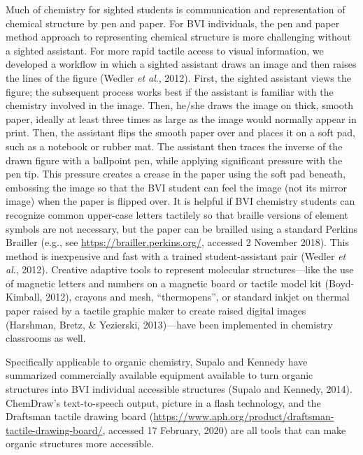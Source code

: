 \documentclass[11.5pt]{sig-alternate} %
\begin{document}
\begin{large}
Much of chemistry for sighted students is communication and representation of chemical structure by pen and paper. For BVI individuals, the pen and paper method approach to representing chemical structure is more challenging without a sighted assistant. For more rapid tactile access to visual information, we developed a workflow in which a sighted assistant draws an image and then raises the lines of the figure (Wedler \textit{et al}., 2012). First, the sighted assistant views the figure; the subsequent process works best if the assistant is familiar with the chemistry involved in the image. Then, he/she draws the image on thick, smooth paper, ideally at least three times as large as the image would normally appear in print. Then, the assistant flips the smooth paper over and places it on a soft pad, such as a notebook or rubber mat. The assistant then traces the inverse of the drawn figure with a ballpoint pen, while applying significant pressure with the pen tip. This pressure creates a crease in the paper using the soft pad beneath, embossing the image so that the BVI student can feel the image (not its mirror image) when the paper is flipped over. It is helpful if BVI chemistry students can recognize common upper-case letters tactilely so that braille versions of element symbols are not necessary, but the paper can be brailled using a standard Perkins Brailler (e.g., see \url{https://brailler.perkins.org/}, accessed 2 November 2018). This method is inexpensive and fast with a trained student-assistant pair (Wedler \textit{et al}., 2012). Creative adaptive tools to represent molecular structures—like the use of magnetic letters and numbers on a magnetic board or tactile model kit (Boyd-Kimball, 2012), crayons and mesh, “thermopens”, or standard inkjet on thermal paper raised by a tactile graphic maker to create raised digital images (Harshman, Bretz, \& Yezierski, 2013)—have been implemented in chemistry classrooms as well.

Specifically applicable to organic chemistry, Supalo and Kennedy have summarized commercially available equipment available to turn organic structures into BVI individual accessible structures (Supalo and Kennedy, 2014). ChemDraw’s text-to-speech output, picture in a flash technology, and the Draftsman tactile drawing board (\url{https://www.aph.org/product/draftsman-tactile-drawing-board/}, accessed 17 February, 2020) are all tools that can make organic structures more accessible. 


\end{large}
\end{document}
